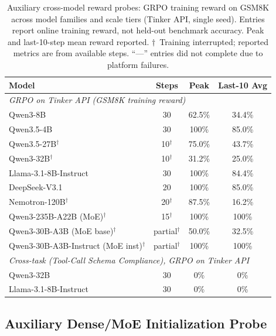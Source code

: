 \documentclass{article}
\begin{document}
\begin{table}[htbp]
\centering
\caption{Auxiliary cross-model reward probes: GRPO training reward on GSM8K across model families and scale tiers (Tinker API, single seed). Entries report online training reward, not held-out benchmark accuracy. Peak and last-10-step mean reward reported. $\dagger$~Training interrupted; reported metrics are from available steps. ``---'' entries did not complete due to platform failures.}
\label{tab:cross_arch_scaling}
\begin{tabular}{lccc}
\toprule
\textbf{Model} & \textbf{Steps} & \textbf{Peak} & \textbf{Last-10 Avg} \\
\midrule
\multicolumn{4}{l}{\textit{GRPO on Tinker API (GSM8K training reward)}} \\
\midrule
Qwen3-8B & 30 & 62.5\% & 34.4\% \\
Qwen3.5-4B & 30 & 100\% & 85.0\% \\
Qwen3.5-27B$^\dagger$ & 10$^\dagger$ & 75.0\% & 43.7\% \\
Qwen3-32B$^\dagger$ & 10$^\dagger$ & 31.2\% & 25.0\% \\
Llama-3.1-8B-Instruct & 30 & 100\% & 84.4\% \\
DeepSeek-V3.1 & 20 & 100\% & 85.0\% \\
Nemotron-120B$^\dagger$ & 20$^\dagger$ & 87.5\% & 16.2\% \\
Qwen3-235B-A22B (MoE)$^\dagger$ & 15$^\dagger$ & 100\% & 100\% \\
Qwen3-30B-A3B (MoE base)$^\dagger$ & partial$^\dagger$ & 50.0\% & 32.5\% \\
Qwen3-30B-A3B-Instruct (MoE inst)$^\dagger$ & partial$^\dagger$ & 100\% & 100\% \\
\midrule
\multicolumn{4}{l}{\textit{Cross-task (Tool-Call Schema Compliance), GRPO on Tinker API}} \\
\midrule
Qwen3-32B & 30 & 0\% & 0\% \\
Llama-3.1-8B-Instruct & 30 & 0\% & 0\% \\
\bottomrule
\end{tabular}
\end{table}


\subsection{Auxiliary Dense/MoE Initialization Probe}
\label{sec:dense_moe}
\end{document}
